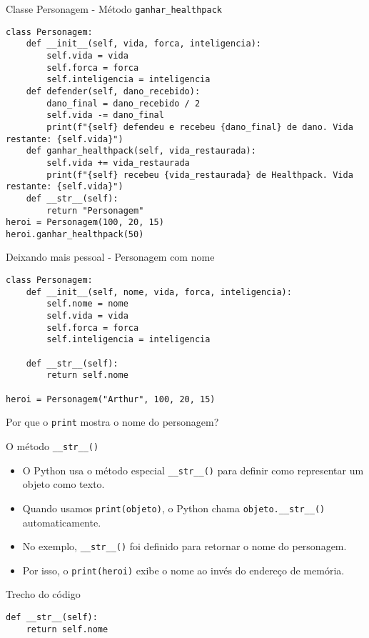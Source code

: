 \begin{frame}[fragile]{Classe Personagem - Método \texttt{ganhar\_healthpack}}

    \begin{verbatim}
class Personagem:
    def __init__(self, vida, forca, inteligencia):
        self.vida = vida
        self.forca = forca
        self.inteligencia = inteligencia
    def defender(self, dano_recebido):
        dano_final = dano_recebido / 2
        self.vida -= dano_final
        print(f"{self} defendeu e recebeu {dano_final} de dano. Vida restante: {self.vida}")
    def ganhar_healthpack(self, vida_restaurada):
        self.vida += vida_restaurada
        print(f"{self} recebeu {vida_restaurada} de Healthpack. Vida restante: {self.vida}")
    def __str__(self):
        return "Personagem"
heroi = Personagem(100, 20, 15)
heroi.ganhar_healthpack(50)
\end{verbatim}

\end{frame}

\begin{frame}[fragile]{Deixando mais pessoal - Personagem com nome}

    \begin{verbatim}
class Personagem:
    def __init__(self, nome, vida, forca, inteligencia):
        self.nome = nome
        self.vida = vida
        self.forca = forca
        self.inteligencia = inteligencia

    def __str__(self):
        return self.nome

heroi = Personagem("Arthur", 100, 20, 15)
\end{verbatim}

\end{frame}

\begin{frame}[fragile]{Por que o \texttt{print} mostra o nome do personagem?}

    \begin{block}{O método \texttt{\_\_str\_\_()}}
        \begin{itemize}
            \item O Python usa o método especial \texttt{\_\_str\_\_()} para definir como representar um objeto como texto.
            \item Quando usamos \texttt{print(objeto)}, o Python chama \texttt{objeto.\_\_str\_\_()} automaticamente.
            \item No exemplo, \texttt{\_\_str\_\_()} foi definido para retornar o nome do personagem.
            \item Por isso, o \texttt{print(heroi)} exibe o nome ao invés do endereço de memória.
        \end{itemize}
    \end{block}

    \begin{exampleblock}{Trecho do código}
        \begin{verbatim}
def __str__(self):
    return self.nome
\end{verbatim}
    \end{exampleblock}

\end{frame}

